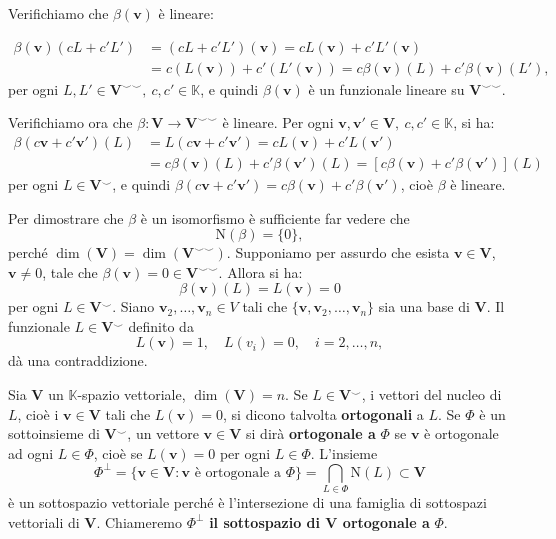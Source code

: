 \documentclass{article}
\theoremstyle{plain}
\theoremstyle{definition}
\theoremstyle{remark}
\begin{document}
Verifichiamo che $\beta(\mathbf{v})$ è lineare:

\[
\begin{aligned}
\beta(\mathbf{v})(cL + c'L') &= (cL + c'L')(\mathbf{v}) = cL(\mathbf{v}) + c'L'(\mathbf{v}) \\
&= c(L(\mathbf{v})) + c'(L'(\mathbf{v})) = c\beta(\mathbf{v})(L) + c'\beta(\mathbf{v})(L'),
\end{aligned}
\]
per ogni $L, L' \in \mathbf{V}^{\smallsmile\smallsmile},\ c, c' \in \mathbb{K}$, e quindi $\beta(\mathbf{v})$ è un funzionale lineare su $\mathbf{V}^{\smallsmile\smallsmile}$.

Verifichiamo ora che $\beta : \mathbf{V} \to \mathbf{V}^{\smallsmile\smallsmile}$ è lineare. 
Per ogni $\mathbf{v}, \mathbf{v}'\in \mathbf{V},\ c, c' \in \mathbb{K}$, si ha:
\[
\begin{aligned}
\beta(c\mathbf{v} + c'\mathbf{v}')(L) &= L(c\mathbf{v} + c'\mathbf{v}') = cL(\mathbf{v}) + c'L(\mathbf{v}') \\
&= c \beta(\mathbf{v})(L) + c' \beta(\mathbf{v}')(L) = [c \beta(\mathbf{v}) + c' \beta(\mathbf{v}')](L)
\end{aligned}
\]
per ogni $L \in \mathbf{V}^{\smallsmile}$, e quindi $\beta(c\mathbf{v} + c'\mathbf{v}') = c \beta(\mathbf{v}) + c' \beta(\mathbf{v}')$, cioè $\beta$ è lineare.

Per dimostrare che $\beta$ è un isomorfismo è sufficiente far vedere che 
\[
\mathrm{N}(\beta) = \{0\},
\]
perché $\dim(\mathbf{V}) = \dim(\mathbf{V}^{\smallsmile\smallsmile})$. 
Supponiamo per assurdo che esista $\mathbf{v} \in \mathbf{V}$, $\mathbf{v} \neq 0$, tale che $\beta(\mathbf{v}) = 0 \in \mathbf{V}^{\smallsmile\smallsmile}$. 
Allora si ha:
\[
\beta(\mathbf{v})(L) = L(\mathbf{v}) = 0
\]
per ogni $L \in \mathbf{V}^{\smallsmile}$. Siano $\mathbf{v}_2, \dots, \mathbf{v}_n \in V$ tali che $\{\mathbf{v}, \mathbf{v}_2, \dots, \mathbf{v}_n\}$ sia una base di $\mathbf{V}$. 
Il funzionale $L \in \mathbf{V}^{\smallsmile}$ definito da
\[
L(\mathbf{v}) = 1,\quad L(v_i) = 0,\quad i = 2, \dots, n,
\]
dà una contraddizione.

\vspace{10pt}

Sia $\mathbf{V}$ un $\mathbb{K}$-spazio vettoriale, $\dim(\mathbf{V}) = n$. 
Se $L \in \mathbf{V}^{\smallsmile}$, i vettori del nucleo di $L$, cioè i $\mathbf{v}\in\mathbf{V}$ tali che $L(\mathbf{v}) = 0$, si dicono talvolta \textbf{ortogonali} a $L$. 
Se $\Phi$ è un sottoinsieme di $\mathbf{V}^{\smallsmile}$, un vettore $\mathbf{v}\in\mathbf{V}$ si dirà \textbf{ortogonale a} $\Phi$ se $\mathbf{v}$ è ortogonale ad ogni $L \in \Phi$, cioè se $L(\mathbf{v}) = 0$ per ogni $L \in \Phi$. 
L'insieme
\[
\Phi^\perp = \{\mathbf{v}\in\mathbf{V} :\mathbf{v}\text{ è ortogonale a } \Phi\} = \bigcap_{L \in \Phi} \mathrm{N}(L) \subset \mathbf{V}
\]
è un sottospazio vettoriale perché è l'intersezione di una famiglia di sottospazi vettoriali di $\mathbf{V}$. 
Chiameremo $\Phi^\perp$ \textbf{il sottospazio di $\mathbf{V}$ ortogonale a} $\Phi$.
\end{document}
